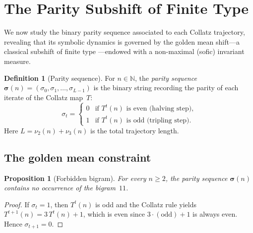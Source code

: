 \documentclass[11pt,a4paper]{article}
\newcommand{\N}{\mathbb{N}}
\theoremstyle{plain}
\newtheorem{proposition}[theorem]{Proposition}
\theoremstyle{definition}
\newtheorem{definition}[theorem]{Definition}
\begin{document}
\section{The Parity Subshift of Finite Type}\label{sec:parity-sft}

We now study the binary parity sequence associated to each Collatz
trajectory, revealing that its symbolic dynamics is governed by the
golden mean shift---a classical subshift of finite type
\cite{LindMarcus2021}---endowed with a non-maximal (sofic)
invariant measure.

\begin{definition}[Parity sequence]\label{def:parity-seq}
    For $n \in \N$, the \emph{parity sequence}
    $\boldsymbol{\sigma}(n) = (\sigma_0, \sigma_1, \ldots,
    \sigma_{L-1})$ is the binary string recording the parity of each
    iterate of the Collatz map~$T$:
    \begin{equation}
        \sigma_t = \begin{cases}
            0 & \text{if } T^t(n) \text{ is even (halving step),} \\
            1 & \text{if } T^t(n) \text{ is odd (tripling step).}
        \end{cases}
    \end{equation}
    Here $L = \nu_2(n) + \nu_3(n)$ is the total trajectory length.
\end{definition}

\subsection{The golden mean constraint}

\begin{proposition}[Forbidden bigram]\label{prop:forbidden-11}
    For every $n \geq 2$, the parity sequence
    $\boldsymbol{\sigma}(n)$ contains no occurrence of the
    bigram~$11$.
\end{proposition}

\begin{proof}
    If $\sigma_t = 1$, then $T^t(n)$ is odd and the Collatz rule
    yields $T^{t+1}(n) = 3\, T^t(n) + 1$, which is even since
    $3 \cdot (\text{odd}) + 1$ is always even.  Hence
    $\sigma_{t+1} = 0$.
\end{proof}
\end{document}
